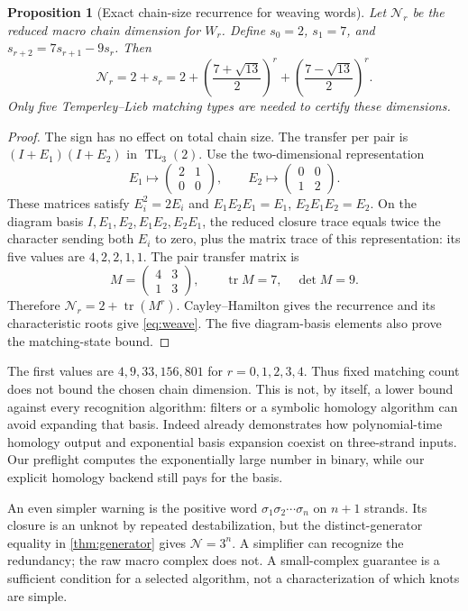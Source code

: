 \documentclass[11pt,letterpaper]{article}
\newtheorem{proposition}[theorem]{Proposition}
\theoremstyle{definition}
\newcommand{\tr}{\operatorname{tr}}
\newcommand{\TL}{\operatorname{TL}}
\newcommand{\N}{\mathcal N}
\begin{document}
\begin{proposition}[Exact chain-size recurrence for weaving words]\label{prop:weaving}
Let \(\N_r\) be the reduced macro chain dimension for \(W_r\). Define
\(s_0=2\), \(s_1=7\), and \(s_{r+2}=7s_{r+1}-9s_r\). Then
\begin{equation}\label{eq:weave}
 \N_r=2+s_r
 =2+\left(\frac{7+\sqrt{13}}2\right)^r
     +\left(\frac{7-\sqrt{13}}2\right)^r.
\end{equation}
Only five Temperley--Lieb matching types are needed to certify these dimensions.
\end{proposition}
\begin{proof}
The sign has no effect on total chain size. The transfer per pair is
\((I+E_1)(I+E_2)\) in \(\TL_3(2)\). Use the two-dimensional representation
\[
 E_1\mapsto\begin{pmatrix}2&1\\0&0\end{pmatrix},\qquad
 E_2\mapsto\begin{pmatrix}0&0\\1&2\end{pmatrix}.
\]
These matrices satisfy \(E_i^2=2E_i\) and
\(E_1E_2E_1=E_1\), \(E_2E_1E_2=E_2\).
On the diagram basis \(I,E_1,E_2,E_1E_2,E_2E_1\), the reduced closure trace equals twice the character sending both \(E_i\) to zero, plus the matrix trace of this representation: its five values are \(4,2,2,1,1\). The pair transfer matrix is
\[
 M=\begin{pmatrix}4&3\\1&3\end{pmatrix},\qquad
 \tr M=7,\quad\det M=9.
\]
Therefore \(\N_r=2+\tr(M^r)\). Cayley--Hamilton gives the recurrence and its characteristic roots give \cref{eq:weave}. The five diagram-basis elements also prove the matching-state bound.
\end{proof}

The first values are \(4,9,33,156,801\) for \(r=0,1,2,3,4\).
Thus fixed matching count does not bound the chosen chain dimension. This is not, by itself, a lower bound against every recognition algorithm: filters or a symbolic homology algorithm can avoid expanding that basis. Indeed \cite{ks26} already demonstrates how polynomial-time homology output and exponential basis expansion coexist on three-strand inputs. Our preflight computes the exponentially large number in binary, while our explicit homology backend still pays for the basis.

An even simpler warning is the positive word
\(\sigma_1\sigma_2\cdots\sigma_n\) on \(n+1\) strands. Its closure is an unknot by repeated destabilization, but the distinct-generator equality in \cref{thm:generator} gives \(\N=3^n\). A simplifier can recognize the redundancy; the raw macro complex does not. A small-complex guarantee is a sufficient condition for a selected algorithm, not a characterization of which knots are simple.
\end{document}
